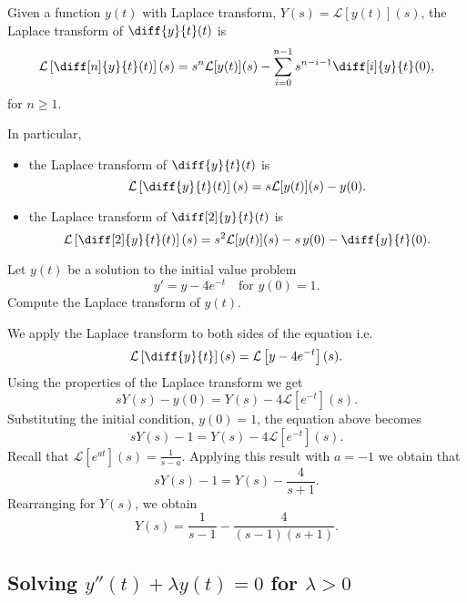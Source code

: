 \documentclass[12pt, a4paper]{article}
\newcommand{\CL}{\mathcal{L}}
\begin{document}
\begin{mdthm}
    Given a function \(y(t)\) with Laplace transform, \(Y(s)=\CL[y(t)](s)\), the Laplace transform of \(\diff{y}{t}(t)\) is 
    \[\CL \left[ \diff[n]{y}{t}(t) \right] (s) = s^n \CL[y(t)](s) - \sum_{i=0}^{n-1} s^{n-i-1} \diff[i]{y}{t}(0),\]
    for \(n\geq 1\).
\end{mdthm}

\begin{mdcor}
    In particular, 
    \begin{itemize}
        \item the Laplace transform of \(\diff{y}{t}(t)\) is 
        \[\CL \left[ \diff{y}{t}(t) \right](s) = s\CL[y(t)](s)-y(0).\]
        \item the Laplace transform of \(\diff[2]{y}{t}(t)\) is 
        \[\CL \left[ \diff[2]{y}{t}(t)\right](s) = s^2 \CL[y(t)](s) - s \, y(0)- \diff{y}{t}(0).\]
    \end{itemize}
\end{mdcor}

\begin{mdexample}
    Let \(y(t)\) be a solution to the initial value problem 
    \[y'=y-4e^{-t} \quad \text{for } y(0)=1.\]
    Compute the Laplace transform of \(y(t)\).
    \begin{solution}
        We apply the Laplace transform to both sides of the equation i.e.
    \[\CL \left[ \diff{y}{t} \right](s) = \CL \left[ y-4e^{-t} \right](s).\]
    Using the properties of the Laplace transform we get 
    \[s Y(s) - y(0) = Y(s)-4\CL\left[ e^{-t} \right](s).\]
    Substituting the initial condition, \(y(0)=1\), the equation above becomes 
    \[sY(s)-1 = Y(s)-4\CL\left[ e^{-t} \right](s).\]
    Recall that \(\CL\left[ e^{at} \right](s) =\frac{1}{s-a}\). Applying this result with \(a=-1\) we obtain that 
    \[sY(s)-1= Y(s)-\frac{4}{s+1}.\]
    Rearranging for \(Y(s)\), we obtain 
    \[Y(s) = \frac{1}{s-1} -\frac{4}{(s-1)(s+1)}.\]
    \end{solution}
\end{mdexample}


\subsection{Solving \texorpdfstring{\(y''(t)+\lambda y(t)=0\)}{TEXT} for \texorpdfstring{\(\lambda>0\)}{TEXT}}
\end{document}

